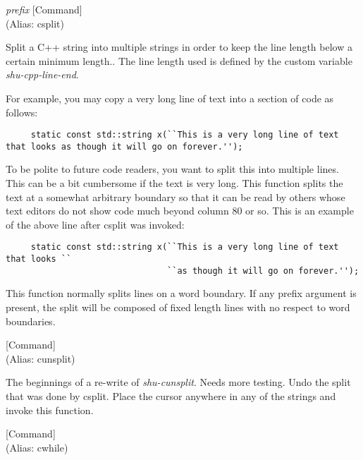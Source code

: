 \vspace{1em}
\noindent
{}
\usebox{\funcname}\emph{prefix}
 \hfill [Command]\\%
 (Alias: csplit)

\begin{doc-string}
Split a C++ string into multiple strings in order to keep the line length
below a certain minimum length..  The line length used is defined by the custom
variable \emph{shu-cpp-line-end}.

For example, you may copy a very long line of text into a section of code as
follows:

\small{\begin{verbatim}
     static const std::string x(``This is a very long line of text that looks as though it will go on forever.'');
\end{verbatim}}

To be polite to future code readers, you want to split this into multiple lines.
This can be a bit cumbersome if the text is very long.  This function splits the
text at a somewhat arbitrary boundary so that it can be read by others whose
text editors do not show code much beyond column 80 or so.  This is an example
of the above line after csplit was invoked:

\small{\begin{verbatim}
     static const std::string x(``This is a very long line of text that looks ``
                                ``as though it will go on forever.'');
\end{verbatim}}

This function normally splits lines on a word boundary.  If any prefix argument
is present, the split will be composed of fixed length lines with no respect to
word boundaries.
\end{doc-string}

\vspace{1em}
\noindent
{}
\usebox{\funcname}
 \hfill [Command]\\%
 (Alias: cunsplit)

\begin{doc-string}
The beginnings of a re-write of \emph{shu-cunsplit}.
Needs more testing.
Undo the split that was done by csplit.  Place the cursor anywhere
in any of the strings and invoke this function.
\end{doc-string}

\vspace{1em}
\noindent
{}
\usebox{\funcname}
 \hfill [Command]\\%
 (Alias: cwhile)

